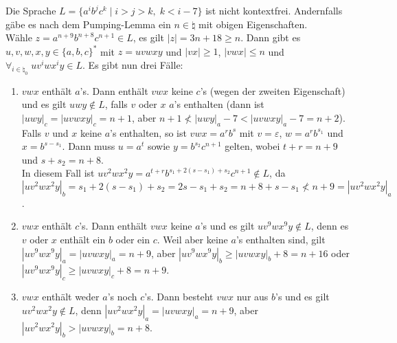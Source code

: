 \begin{Bsp}
    Die Sprache $L = \{a^i b^j c^k \;|\; i > j > k,\; k < i - 7\}$ ist nicht
    kontextfrei.
    Andernfalls gäbe es nach dem Pumping-Lemma ein $n \in \natural$ mit
    obigen Eigenschaften.\\
    Wähle $z = a^{n+9} b^{n+8} c^{n+1} \in L$,
    es gilt $|z| = 3n + 18 \ge n$.
    Dann gibt es $u, v, w, x, y \in \{a, b, c\}^\ast$ mit $z = uvwxy$ und
    $|vx| \ge 1$, $|vwx| \le n$ und
    $\forall_{i \in \natural_0}\; uv^iwx^iy \in L$.
    Es gibt nun drei Fälle:
    \begin{enumerate}
        \item
        $vwx$ enthält $a$'s.
        Dann enthält $vwx$ keine $c$'s (wegen der zweiten Eigenschaft) und
        es gilt $uwy \notin L$, falls $v$ oder $x$ $a$'s enthalten
        (dann ist $|uwy|_c = |uvwxy|_c = n + 1$, aber
        $n + 1 \not< |uwy|_a - 7 < |uvwxy|_a - 7 = n + 2$).\\
        Falls $v$ und $x$ keine $a$'s enthalten, so ist
        $vwx = a^r b^s$ mit $v = \varepsilon$, $w = a^r b^{s_1}$ und
        $x = b^{s - s_1}$.
        Dann muss $u = a^t$ sowie $y = b^{s_2} c^{n+1}$ gelten, wobei
        $t + r = n + 9$ und $s + s_2 = n + 8$.\\
        In diesem Fall ist $uv^2 wx^2 y =
        a^{t+r} b^{s_1 + 2(s - s_1) + s_2} c^{n+1} \notin L$, da\\
        $|uv^2 wx^2 y|_b = s_1 + 2(s - s_1) + s_2 = 2s - s_1 + s_2 =
        n + 8 + s - s_1 \not< n + 9 = |uv^2 wx^2 y|_a$.

        \item
        $vwx$ enthält $c$'s.
        Dann enthält $vwx$ keine $a$'s und es gilt
        $uv^9 wx^9 y \notin L$, denn es $v$ oder $x$ enthält ein $b$ oder
        ein $c$.
        Weil aber keine $a$'s enthalten sind, gilt
        $|uv^9 wx^9 y|_a = |uvwxy|_a = n + 9$, aber
        $|uv^9 wx^9 y|_b \ge |uvwxy|_b + 8 = n + 16$ oder
        $|uv^9 wx^9 y|_c \ge |uvwxy|_c + 8 = n + 9$.

        \item
        $vwx$ enthält weder $a$'s noch $c$'s.
        Dann besteht $vwx$ nur aus $b$'s und es gilt
        $uv^2 wx^2 y \notin L$, denn $|uv^2 wx^2 y|_a = |uvwxy|_a = n + 9$,
        aber $|uv^2 wx^2 y|_b > |uvwxy|_b = n + 8$.
    \end{enumerate}
\end{Bsp}

\linie
\pagebreak

